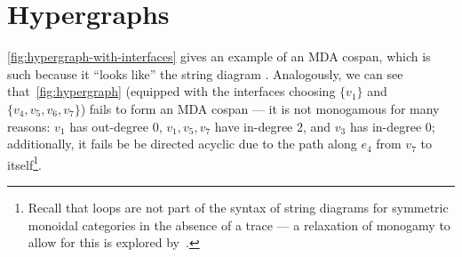 \section{Hypergraphs}
\label{sec:appendix:hyp}
\autoref{fig:hypergraph-with-interfaces} gives an example of an MDA cospan, which is such because it \enquote{looks like} the string diagram \comonoid.
Analogously, we can see that~\autoref{fig:hypergraph} (equipped with the interfaces choosing $\{ v_1 \}$ and $\{ v_4, v_5, v_6, v_7 \}$) fails to form an MDA cospan --- it is not monogamous for many reasons: $v_1$ has out-degree 0, $v_1, v_5, v_7$ have in-degree 2, and $v_3$ has in-degree 0; additionally, it fails be be directed acyclic due to the path along $e_4$ from $v_7$ to itself\footnote{Recall that loops are not part of the syntax of string diagrams for symmetric monoidal categories in the absence of a trace --- a relaxation of monogamy to allow for this is explored by~\citet{ghica_rewriting_2023}.}.

